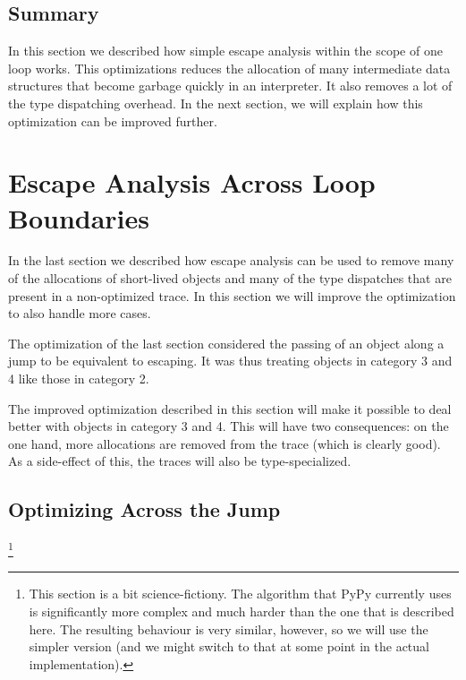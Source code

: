 \documentclass{sigplanconf}
\begin{document}

\subsection{Summary}

In this section we described how simple escape analysis within the scope of one
loop works. This optimizations reduces the allocation of many intermediate data
structures that become garbage quickly in an interpreter. It also removes a lot
of the type dispatching overhead. In the next section, we will explain how this
optimization can be improved further.


\section{Escape Analysis Across Loop Boundaries}
\label{sec:crossloop}

In the last section we described how escape analysis can be used to remove
many of the allocations of short-lived objects and many of the type dispatches
that are present in a non-optimized trace. In this section we will improve the
optimization to also handle more cases.

The optimization of the last section considered the passing of an object along a
jump to be equivalent to escaping. It was thus treating objects in category 3
and 4 like those in category 2.

The improved optimization described in this section will make it possible to deal
better with objects in category 3 and 4. This will have two consequences: on
the one hand, more allocations are removed from the trace (which is clearly
good). As a side-effect of this, the traces will also be type-specialized.



\subsection{Optimizing Across the Jump}

\footnote{This section is a bit
science-fictiony. The algorithm that PyPy currently uses is significantly more
complex and much harder than the one that is described here. The resulting
behaviour is very similar, however, so we will use the simpler version (and we
might switch to that at some point in the actual implementation).}
\end{document}
